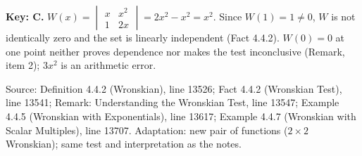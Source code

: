 \documentclass[11pt,a4paper]{article}
\newcommand{\Src}[1]{{\footnotesize\color{black!65}Source: #1}}
\begin{document}
\textbf{Key: C.} $W(x)=\begin{vmatrix}x&x^{2}\\1&2x\end{vmatrix}=2x^{2}-x^{2}=x^{2}$. Since $W(1)=1\neq0$, $W$ is not identically zero and the set is linearly independent (Fact 4.4.2). $W(0)=0$ at one point neither proves dependence nor makes the test inconclusive (Remark, item 2); $3x^2$ is an arithmetic error.\par
\Src{Definition 4.4.2 (Wronskian), line 13526; Fact 4.4.2 (Wronskian Test), line 13541; Remark: Understanding the Wronskian Test, line 13547; Example 4.4.5 (Wronskian with Exponentials), line 13617; Example 4.4.7 (Wronskian with Scalar Multiples), line 13707. Adaptation: new pair of functions ($2\times2$ Wronskian); same test and interpretation as the notes.}\par
\end{document}
